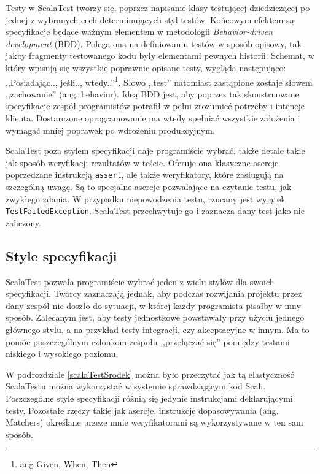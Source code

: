\documentclass[wimgr]{xmgr}
\begin{document}
Testy w ScalaTest tworzy się, poprzez napisanie klasy testującej dziedziczącej po jednej z wybranych cech determinujących styl testów. Końcowym efektem są specyfikacje będące ważnym elementem w metodologii \emph{Behavior-driven development} (BDD). Polega ona na definiowaniu testów w sposób opisowy, tak jakby fragmenty testowanego kodu były elementami pewnych historii. Schemat, w który wpisują się wszystkie poprawnie opisane testy, wygląda następująco: ,,Posiadając.., jeśli.., wtedy..''\footnote{ang Given, When, Then}. Słowo ,,test'' natomiast zastąpione zostaje słowem ,,zachowanie'' (ang. behavior). Ideą BDD jest, aby poprzez tak skonstruowane specyfikacje zespół programistów potrafił w pełni zrozumieć potrzeby i intencje klienta. Dostarczone oprogramowanie ma wtedy spełniać wszystkie założenia i wymagać mniej poprawek po wdrożeniu produkcyjnym.

ScalaTest poza stylem specyfikacji daje programiście wybrać, także detale takie jak sposób weryfikacji rezultatów w teście. Oferuje ona klasyczne asercje poprzedzane instrukcją \texttt{assert}, ale także weryfikatory, które zasługują na szczególną uwagę. Są to specjalne asercje pozwalające na czytanie testu, jak zwykłego zdania. W przypadku niepowodzenia testu, rzucany jest wyjątek \texttt{TestFailedException}. ScalaTest przechwytuje go i zaznacza dany test jako nie zaliczony.

\subsection{Style specyfikacji}

ScalaTest pozwala programiście wybrać jeden z wielu stylów dla swoich specyfikacji. Twórcy zaznaczają jednak, aby podczas rozwijania projektu przez dany zespół nie doszło do sytuacji, w której każdy programista pisałby w inny sposób. Zalecanym jest, aby testy jednostkowe powstawały przy użyciu jednego głównego stylu, a na przykład testy integracji, czy akceptacyjne w innym. Ma to pomóc poszczególnym członkom zespołu ,,przełączać się'' pomiędzy testami niskiego i wysokiego poziomu.

W podrozdziale \ref{scalaTestSrodek} można było przeczytać jak tą elastyczność ScalaTestu można wykorzystać w systemie sprawdzającym kod Scali. Poszczególne style specyfikacji różnią się jedynie instrukcjami deklarującymi testy. Pozostałe rzeczy takie jak asercje, instrukcje dopasowywania (ang. Matchers) określane przeze mnie weryfikatorami są wykorzystywane w ten sam sposób.
\end{document}
